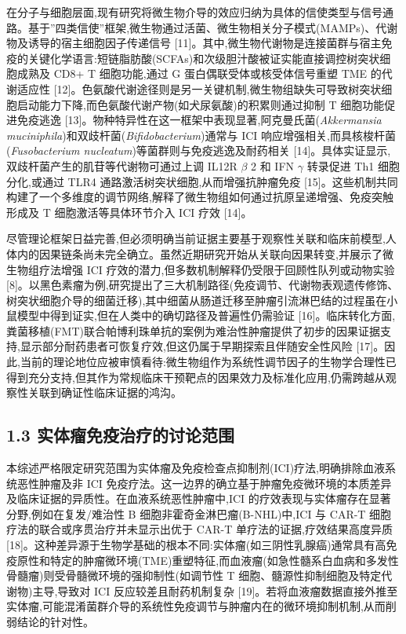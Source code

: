 \documentclass[11pt]{article}
\begin{document}
在分子与细胞层面,现有研究将微生物介导的效应归纳为具体的信使类型与信号通路。基于''四类信使''框架,微生物通过活菌、微生物相关分子模式(MAMPs)、代谢物及诱导的宿主细胞因子传递信号 {[}11{]}。其中,微生物代谢物是连接菌群与宿主免疫的关键化学语言:短链脂肪酸(SCFAs)和次级胆汁酸被证实能直接调控树突状细胞成熟及 CD8+ T 细胞功能,通过 G 蛋白偶联受体或核受体信号重塑 TME 的代谢适应性 {[}12{]}。色氨酸代谢途径则是另一关键机制,微生物组缺失可导致树突状细胞启动能力下降,而色氨酸代谢产物(如犬尿氨酸)的积累则通过抑制 T 细胞功能促进免疫逃逸 {[}13{]}。物种特异性在这一框架中表现显著,阿克曼氏菌(\emph{Akkermansia muciniphila})和双歧杆菌(\emph{Bifidobacterium})通常与 ICI 响应增强相关,而具核梭杆菌(\emph{Fusobacterium nucleatum})等菌群则与免疫逃逸及耐药相关 {[}14{]}。具体实证显示,双歧杆菌产生的肌苷等代谢物可通过上调 IL12R \(\beta\) 2 和 IFN \(\gamma\) 转录促进 Th1 细胞分化,或通过 TLR4 通路激活树突状细胞,从而增强抗肿瘤免疫 {[}15{]}。这些机制共同构建了一个多维度的调节网络,解释了微生物组如何通过抗原呈递增强、免疫突触形成及 T 细胞激活等具体环节介入 ICI 疗效 {[}14{]}。

尽管理论框架日益完善,但必须明确当前证据主要基于观察性关联和临床前模型,人体内的因果链条尚未完全确立。虽然近期研究开始从关联向因果转变,并展示了微生物组疗法增强 ICI 疗效的潜力,但多数机制解释仍受限于回顾性队列或动物实验 {[}8{]}。以黑色素瘤为例,研究提出了三大机制路径(免疫调节、代谢物表观遗传修饰、树突状细胞介导的细菌迁移),其中细菌从肠道迁移至肿瘤引流淋巴结的过程虽在小鼠模型中得到证实,但在人类中的确切路径及普遍性仍需验证 {[}16{]}。临床转化方面,粪菌移植(FMT)联合帕博利珠单抗的案例为难治性肿瘤提供了初步的因果证据支持,显示部分耐药患者可恢复疗效,但这仍属于早期探索且伴随安全性风险 {[}17{]}。因此,当前的理论地位应被审慎看待:微生物组作为系统性调节因子的生物学合理性已得到充分支持,但其作为常规临床干预靶点的因果效力及标准化应用,仍需跨越从观察性关联到确证性临床证据的鸿沟。

\subsection{1.3 实体瘤免疫治疗的讨论范围}\label{ux5b9eux4f53ux7624ux514dux75abux6cbbux7597ux7684ux8ba8ux8bbaux8303ux56f4}

本综述严格限定研究范围为实体瘤及免疫检查点抑制剂(ICI)疗法,明确排除血液系统恶性肿瘤及非 ICI 免疫疗法。这一边界的确立基于肿瘤免疫微环境的本质差异及临床证据的异质性。在血液系统恶性肿瘤中,ICI 的疗效表现与实体瘤存在显著分野,例如在复发/难治性 B 细胞非霍奇金淋巴瘤(B-NHL)中,ICI 与 CAR-T 细胞疗法的联合或序贯治疗并未显示出优于 CAR-T 单疗法的证据,疗效结果高度异质 {[}18{]}。这种差异源于生物学基础的根本不同:实体瘤(如三阴性乳腺癌)通常具有高免疫原性和特定的肿瘤微环境(TME)重塑特征,而血液瘤(如急性髓系白血病和多发性骨髓瘤)则受骨髓微环境的强抑制性(如调节性 T 细胞、髓源性抑制细胞及特定代谢物)主导,导致对 ICI 反应较差且耐药机制复杂 {[}19{]}。若将血液瘤数据直接外推至实体瘤,可能混淆菌群介导的系统性免疫调节与肿瘤内在的微环境抑制机制,从而削弱结论的针对性。
\end{document}
